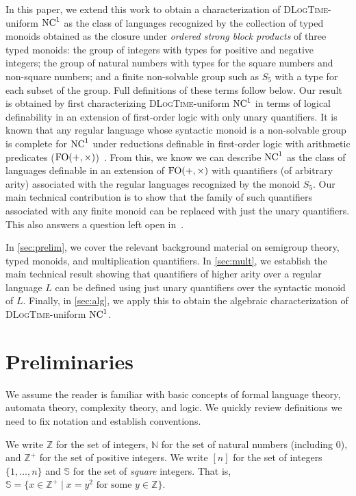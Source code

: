 \documentclass[a4paper,UKenglish,cleveref, autoref, thm-restate, anonymous]{lipics-v2021}
\begin{document}
In this paper, we extend this work to obtain a characterization of \textsc{DLogTime}-uniform $\mathrm{NC}^1$ as the class of languages recognized by the collection of typed monoids obtained as the closure under \emph{ordered strong block products} of three typed monoids: the group of integers with types for positive and negative integers; the group of natural numbers with types for the square numbers and non-square numbers; and a finite non-solvable group such as $S_5$ with a type for each subset of the group.  Full definitions of these terms follow below.  Our result is obtained by first characterizing \textsc{DLogTime}-uniform $\mathrm{NC}^1$ in terms of logical definability in an extension of first-order logic with only unary quantifiers.  It is known that any regular language whose syntactic monoid is a non-solvable group is complete for $\mathrm{NC}^1$ under reductions definable in first-order logic with arithmetic predicates ($\mathrm{FO}(+,\times)$)~\cite{barrington1990uniformity}.  From this, we know we can describe $\mathrm{NC}^1$ as the class of languages definable in an extension of $\mathrm{FO}(+,\times)$ with quantifiers (of arbitrary arity) associated with the regular languages recognized by the monoid $S_5$.  Our main technical contribution is to show that the family of such quantifiers associated with any finite monoid can be replaced with just the unary quantifiers.  This also answers a question left open in~\cite{lautemann2001descriptive}.

In \autoref{sec:prelim}, we cover the relevant background material on semigroup theory, typed monoids, and multiplication quantifiers.   In \autoref{sec:mult}, we establish the main technical result showing that quantifiers of higher arity over a regular language $L$ can be defined using just unary quantifiers over the syntactic monoid of $L$.  Finally, in \autoref{sec:alg}, we apply this to obtain the algebraic characterization of \textsc{DLogTime}-uniform $\mathrm{NC}^1$.



\section{Preliminaries}\label{sec:prelim}


We assume the reader is familiar with basic concepts of formal language theory, automata theory, complexity theory, and logic.  We quickly review definitions we need to fix notation and establish conventions.

We write $\mathbb{Z}$ for the set of integers, $\mathbb{N}$ for the set of natural numbers (including $0$), and $\mathbb{Z}^+$ for the set of positive integers.
We write $[n]$ for the set of integers $\{1,\ldots,n\}$ and $\mathbb{S}$ for the set of \emph{square} integers.  That is, $\mathbb{S} = \{ x \in \mathbb{Z}^+ \mid x = y^2 \text{ for some } y \in \mathbb{Z}\}$.
\end{document}
